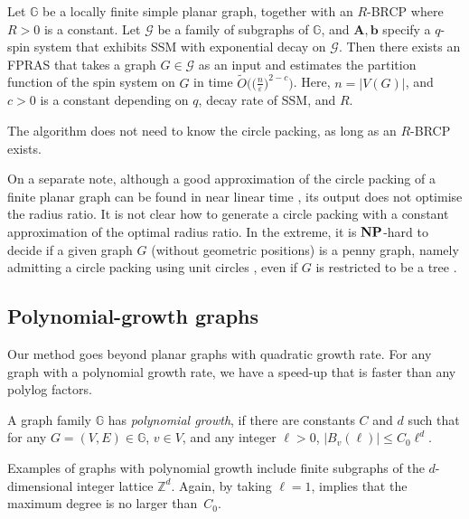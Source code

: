 \documentclass{theoretics}
\def\+#1{\mathcal{#1}}
\def\=#1{\mathbb{#1}}
\newcommand{\abs}[1]{\ensuremath{\left\vert#1\right\vert}}
\newcommand{\eps}{\varepsilon}
\newcommand{\NP}{\textnormal{\textbf{NP}}}
\begin{document}
\begin{corollary}\label{cor:BRCP}
  Let $\mathbb{G}$ be a locally finite simple planar graph, together with an $R$-BRCP where $R>0$ is a constant. 
Let $\+{G}$ be a family of subgraphs of $\mathbb{G}$,
and ${\mathbf{A}}, {\mathbf{b}}$ specify a $q$-spin system that exhibits SSM with exponential decay on $\mathcal{G}$. 
Then there exists an FPRAS that takes a graph $G\in\mathcal{G}$ as an input and estimates the partition function of the spin system on $G$ in time $\widetilde{O}\big(\big(\frac{n}{\eps}\big)^{2-c}\big)$. 
Here, $n=|V(G)|$, and $c>0$ is a constant depending on $q$, decay rate of SSM, and $R$. 
\end{corollary}

\begin{remark}
  The algorithm does not need to know the circle packing,
  as long as an $R$-BRCP exists.

  On a separate note, although a good approximation of the circle packing of a finite planar graph can be found in near linear time \cite{DLQ20}, 
  its output does not optimise the radius ratio.
  It is not clear how to generate a circle packing with a constant approximation of the optimal radius ratio. 
  In the extreme, it is $\NP$-hard to decide if a given graph $G$ (without geometric positions) is a penny graph, namely admitting a circle packing using unit circles \cite{EW96}, even if $G$ is restricted to be a tree \cite{BDLRST15}. 
\end{remark}

\subsection{Polynomial-growth graphs} \label{sec:poly-growth}

Our method goes beyond planar graphs with quadratic growth rate.
For any graph with a polynomial growth rate, we have a speed-up that is faster than any polylog factors.

\begin{definition}  \label{def:poly-growth}
  A graph family $\=G$ has \emph{polynomial growth},
  if there are constants $C$ and $d$ such that for any $G=(V,E)\in\=G$, $v\in V$, and any integer $\ell>0$,
  $\abs{B_v(\ell)}\le C_0\ell^d$.
\end{definition}

Examples of graphs with polynomial growth include finite subgraphs of the $d$-dimensional integer lattice $\=Z^d$.
Again, by taking $\ell=1$,  implies that the maximum degree is no larger than~$C_0$.
\end{document}
